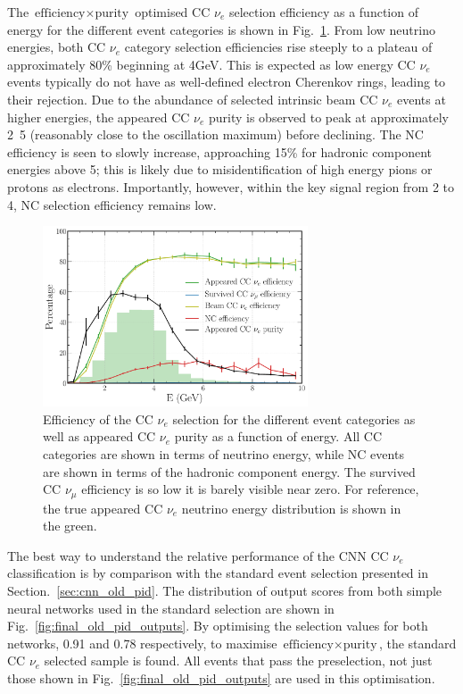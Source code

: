 The $\text{efficiency}\times\text{purity}$ optimised CC $\nu_{e}$ selection efficiency as a
function of energy for the different event categories is shown in Fig.~\ref{fig:final_nuel_hists}.
From low neutrino energies, both CC $\nu_{e}$ category selection efficiencies rise steeply to a
plateau of approximately 80\% beginning at \unit{4}{GeV}. This is expected as low energy CC
$\nu_{e}$ events typically do not have as well-defined electron Cherenkov rings, leading to their
rejection. Due to the abundance of selected intrinsic beam CC $\nu_{e}$ events at higher energies,
the appeared CC $\nu_{e}$ purity is observed to peak at approximately \unit{2.5}{\GeV} (reasonably
close to the oscillation maximum) before declining. The NC efficiency is seen to slowly increase,
approaching 15\% for hadronic component energies above \unit{5}{\GeV}; this is likely due to
misidentification of high energy pions or protons as electrons. Importantly, however, within the
key signal region from 2 to \unit{4}{\GeV}, NC selection efficiency remains low.

\begin{figure} %
    \includegraphics[width=0.7\textwidth]{diagrams/7-results/final_nuel_hists.pdf}
    \caption[Efficiency of the CC $\nu_{e}$ selection as a function of energy]
    {Efficiency of the CC $\nu_{e}$ selection for the different event categories as well as
        appeared CC $\nu_{e}$ purity as a function of energy. All CC categories are shown in terms
        of neutrino energy, while NC events are shown in terms of the hadronic component energy.
        The survived CC $\nu_{\mu}$ efficiency is so low it is barely visible near zero. For
        reference, the true appeared CC $\nu_{e}$ neutrino energy distribution is shown in the
        green.}
    \label{fig:final_nuel_hists}
\end{figure}

The best way to understand the relative performance of the CNN CC $\nu_{e}$ classification is by
comparison with the standard event selection presented in Section.~\ref{sec:cnn_old_pid}. The
distribution of output scores from both simple neural networks used in the standard selection are
shown in Fig.~\ref{fig:final_old_pid_outputs}. By optimising the selection values for both
networks, 0.91 and 0.78 respectively, to maximise $\text{efficiency}\times\text{purity}$, the
standard CC $\nu_{e}$ selected sample is found. All events that pass the preselection, not just
those shown in Fig.~\ref{fig:final_old_pid_outputs} are used in this optimisation.

